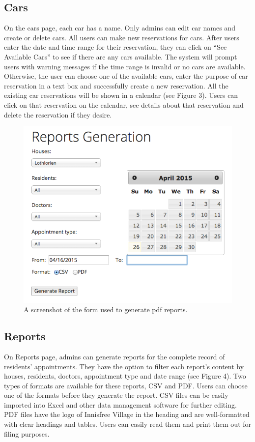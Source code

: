 \documentclass{sig-alternate}
\begin{document}
\subsection{Cars}
On the cars page, each car has a name. Only admins can edit car names and create or delete cars. All users can make new reservations for cars. After users enter the date and time range for their reservation, they can click on “See Available Cars” to see if there are any cars available. The system will prompt users with warning messages if the time range is invalid or no cars are available. Otherwise, the user can choose one of the available cars, enter the purpose of car reservation in a text box and successfully create a new reservation. All the existing car reservations will be shown in a calendar (see Figure 3). Users can click on that reservation on the calendar, see details about that reservation and delete the reservation if they desire. 

\begin{figure}
\includegraphics[scale=0.4]{ReportGeneration}
\caption{A screenshot of the form used to generate pdf reports.}
\end{figure}

\subsection{Reports}
On Reports page, admins can generate reports for the complete record of residents' appointments. They have the option to filter each report's content by houses, residents, doctors, appointment type and date range (see Figure 4). Two types of formats are available for these reports, CSV and PDF. Users can choose one of the formats before they generate the report. CSV files can be easily imported into Excel and other data management software for further editing. PDF files have the logo of Innisfree Village in the heading and are well-formatted with clear headings and tables. Users can easily read them and print them out for filing purposes. 
\end{document}
